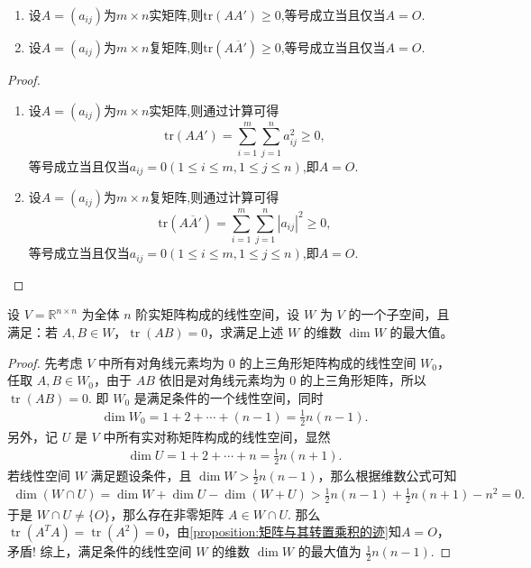 \documentclass[../../main.tex]{subfiles}%
\begin{document}
\begin{proposition}\label{proposition:矩阵与其转置乘积的迹}
\begin{enumerate}[(1)]
\item 设\(A=(a_{ij})\)为\(m\times n\)实矩阵,则\(\mathrm{tr}(AA')\geqslant 0\),等号成立当且仅当\(A = O\).

\item 设\(A=(a_{ij})\)为\(m\times n\)复矩阵,则\(\mathrm{tr}(A\overline{A}')\geqslant 0\),等号成立当且仅当\(A = O\).
\end{enumerate}
\end{proposition}
\begin{proof}
\begin{enumerate}[(1)]
\item 设\(A=(a_{ij})\)为\(m\times n\)实矩阵,则通过计算可得
\[
\mathrm{tr}(AA')=\sum_{i = 1}^{m}\sum_{j = 1}^{n}a_{ij}^2\geqslant 0,
\]
等号成立当且仅当\(a_{ij}=0(1\leqslant  i\leqslant  m,1\leqslant  j\leqslant  n)\),即\(A = O\).

\item 设\(A=(a_{ij})\)为\(m\times n\)复矩阵,则通过计算可得
\[
\mathrm{tr}(A\overline{A}')=\sum_{i = 1}^{m}\sum_{j = 1}^{n}|a_{ij}|^2\geqslant 0,
\]
等号成立当且仅当\(a_{ij}=0(1\leqslant  i\leqslant  m,1\leqslant  j\leqslant  n)\),即\(A = O\).
\end{enumerate}
\end{proof}

\begin{example}
设 $V = \mathbb{R}^{n \times n}$ 为全体 $n$ 阶实矩阵构成的线性空间，设 $W$ 为 $V$ 的一个子空间，且满足：若 $A, B \in W$，$\operatorname{tr}(AB) = 0$，求满足上述 $W$ 的维数 $\dim W$ 的最大值。
\end{example}
\begin{proof}
先考虑 $V$ 中所有对角线元素均为 $0$ 的上三角形矩阵构成的线性空间 $W_0$，任取 $A, B \in W_0$，由于 $AB$ 依旧是对角线元素均为 $0$ 的上三角形矩阵，所以 $\operatorname{tr}(AB) = 0$. 即 $W_0$ 是满足条件的一个线性空间，同时
\begin{align*}
\dim W_0 = 1 + 2 + \cdots + (n-1) = \frac{1}{2}n(n-1).
\end{align*}
另外，记 $U$ 是 $V$ 中所有实对称矩阵构成的线性空间，显然
\begin{align*}
\dim U = 1 + 2 + \cdots + n = \frac{1}{2}n(n+1).
\end{align*}
若线性空间 $W$ 满足题设条件，且 $\dim W > \frac{1}{2}n(n-1)$，那么根据维数公式可知
\begin{align*}
\dim(W \cap U) = \dim W + \dim U - \dim(W + U) > \frac{1}{2}n(n-1) + \frac{1}{2}n(n+1) - n^2 = 0.
\end{align*}
于是 $W \cap U \neq \{O\}$，那么存在非零矩阵 $A \in W \cap U$. 那么 $\operatorname{tr}(A^T A) = \operatorname{tr}(A^2) = 0$，由\cref{proposition:矩阵与其转置乘积的迹}知$A = O$，矛盾! 综上，满足条件的线性空间 $W$ 的维数 $\dim W$ 的最大值为 $\frac{1}{2}n(n-1)$.
\end{proof}
\end{document}
